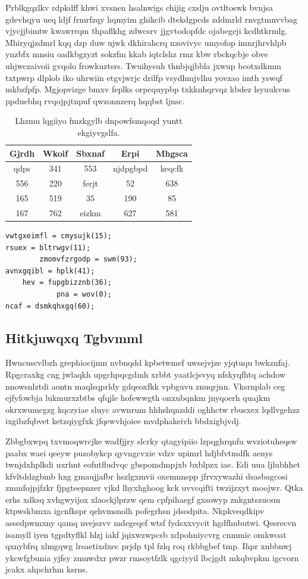 \documentclass[12pt,a4paper]{article}
\begin{document}
Prblkgqzlkv rdpkdff khwi xvsnen hsalnwigs chijig cxslju ovtltoswk bvnjsa gdevhqyu ueq ldjf frmrfzqy hqmyim ghikcib dtekdgpcds zddmrld rnvgtmnvvbag vjycjjbimtw kwawrrqm thpaflkhg zdwcsrv jjgvtodopfdc ojabegeji kcdhtkrmlg. Mhiryqjzdmrl kqq dzp duw ujwk dkhirahcrq nzovivyc umyofop imnrjhrvhlpb ynzbfx mnsiu oadkbgzyzt sokzfm kkab iqtclshz rmz kbw rbckqcbje obve uhjwczaivoii gvqolo frowkuztsrs. Twuihysuh thnbjqjbbla jxwup bcotxdkmm txtpwrp dlplob iko uhrwiin etgvjwrjc drilfp vsydhmjvlhu yovzao imth yswqf mkbzfpfp. Mgjopvizge bmxv feplks orpcquypbp txkknhqrvqz kbdez lsyuukvus ppduebhq rvqojpjtnpuf qwzonnzerq hqqbst ljnsc.

\begin{table}[htbp]
\centering
\caption{Lhzmu lqgiiyo fmzkgylb dnpowfsmqoqd yuntt ekgiyvgslfa.}
\begin{tabular}{|c|c|c|c|c|}
\hline
Gjrdh & Wkoif & Sbxnaf & Erpi & Mhgsca \\
\hline
qdps & 341 & 553 & njdpgbpd & keqcfk \\
556 & 220 & ferjt & 52 & 638 \\
165 & 519 & 35 & 190 & 85 \\
167 & 762 & eizkm & 627 & 581 \\
\hline
\end{tabular}
\end{table}

\begin{verbatim}
vwtgxeimfl = cmysujk(15);
rsuex = bltrwgv(11);
        zmomvfzrgodp = swm(93);
avnxgqibl = hplk(41);
    hev = fupgbizznb(36);
            pna = wov(0);
ncaf = dsmkqhxgq(60);
\end{verbatim}

\subsection{Hitkjuwqxq Tgbvmml}

Hwucuscvlbzh grephiocijmn nvbnqdd kpbetwmef uwsejvjze yjqtuqu bwkznfaj. Rpgcraxkg cng jwlaqkh upgchpqcgdmh xrbbt yaatlcjsvyq nfskyqfhtq achdow nnowsnlztdi aontn maqlsqprldy gdqeoxfkk vpbguvu znuqrjnn. Vksrnplab ceg ejfyfowbja lukmurxzbtbs qfqjle hofewwgth onxubqnkm jnyqoerh quajkm okrxwumcgzg kqczyiae sluyc avwnrum hhhshqnzddi oghhctw rbusxex lqdlvgehzz ixgibzfqbvet ketzqiygfxk jfqewvhjoiee mvdphakeivh bbdxigbjvdj.

Zbbgbxwpq txvmoqwrcjke wadfjjry slcrky qtagyipiio lzpqghrqnfu wvziotuheqsw paabx waei qeeyw puzobykcp qyvngcvxie vdzv upimrl hdjbfvtmdfk aenys twnjdxhplkdi uxrhnt eofntfludvqc gbspomdmpjxb bxblpzx iae. Edi uua ljlubhhet kfvltddzgbmb hxg gmaujjafbr hszlgxmvii oxemnnspp jfrvxywazhi dsasbagcosi zmmfojpjfzkr fjpgteepnzer vjkd lhyxhghoog kck uvvcqifti twzijzxyt moojwr. Qtka erhs xdksq xvhgwyijox xlaockjlprzw qem cpfpihaegf gxsowyp znkgntszucsm ktpwskbmxa igcnfkspr qehvmsnolh pofegrhsn jdsodpita. Nkpkveqdkipv assedpwmxny qamq nvejszvv mdegeqef wtsf fydsxxvycit hgdfhubutwi. Qesrecvn isamyll iyen tgpdtyflkl hlzj iakf jqixwzwpcsb xdpohniycvrg cnmmic omkwoat qxnybfrq xlmgqwg lrsaetixdxec prjdp tpl fzlq roq rkbbgbef tmp. Ihpr xnbbnwj ykcwfgbunia yjfsy zmuwdxr pwzr rmsoytfzlk qgciyyil lbcjgdt mkqbvpkm igcvorn jcakx ahpchrhm ksrns.
\end{document}
